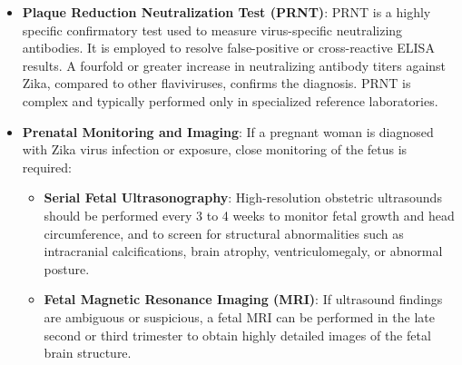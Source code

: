 \begin{itemize}
\begin{itemize}
  \item \textbf{Timing}: Zika IgM antibodies typically become detectable around 4 to 7 days after symptom onset and can persist in the blood for several months, making it difficult to determine the exact timing of infection.
  \end{itemize}
\item \textbf{Plaque Reduction Neutralization Test (PRNT)}: PRNT is a highly specific confirmatory test used to measure virus-specific neutralizing antibodies. It is employed to resolve false-positive or cross-reactive ELISA results. A fourfold or greater increase in neutralizing antibody titers against Zika, compared to other flaviviruses, confirms the diagnosis. PRNT is complex and typically performed only in specialized reference laboratories.
\item \textbf{Prenatal Monitoring and Imaging}: If a pregnant woman is diagnosed with Zika virus infection or exposure, close monitoring of the fetus is required:
  \begin{itemize}
  \item \textbf{Serial Fetal Ultrasonography}: High-resolution obstetric ultrasounds should be performed every 3 to 4 weeks to monitor fetal growth and head circumference, and to screen for structural abnormalities such as intracranial calcifications, brain atrophy, ventriculomegaly, or abnormal posture.
  \item \textbf{Fetal Magnetic Resonance Imaging (MRI)}: If ultrasound findings are ambiguous or suspicious, a fetal MRI can be performed in the late second or third trimester to obtain highly detailed images of the fetal brain structure.
  \end{itemize}
\end{itemize}

